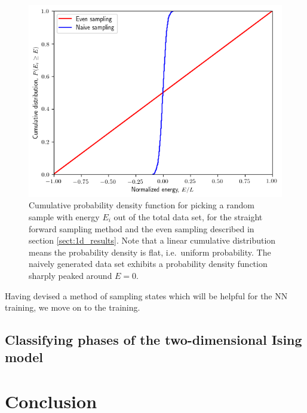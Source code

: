 \documentclass[a4paper, twocolumn]{article}
\begin{document}
\begin{figure}
  \centering
  \includegraphics[width=\textwidth]{visualize_sampling.png}
  \caption{Cumulative probability density function for picking a random sample with energy $E_i$ out of the total data set, for the straight forward sampling method and the even sampling described in section \ref{sect:1d_results}. Note that a linear cumulative distribution means the probability density is flat, i.e.\ uniform probability. The naively generated data set exhibits a probability density function sharply peaked around $E=0$. \label{fig:cdf}}
\end{figure}

Having devised a method of sampling states which will be helpful for the NN training, we move on to the training. 




\subsection{Classifying phases of the two-dimensional Ising model}
\lipsum[10]
\section{Conclusion}
\lipsum[11]

\onecolumn{
\printbibliography
}
\end{document}
